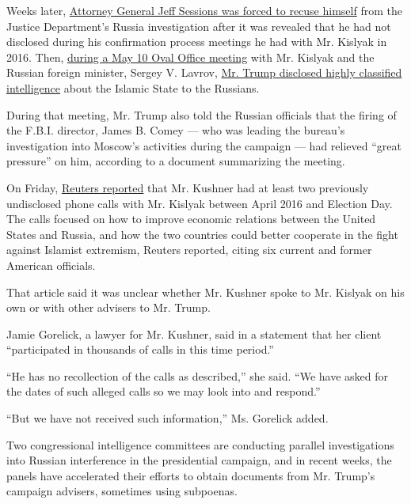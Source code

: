 Weeks later,
\href{https://www.nytimes3xbfgragh.onion/2017/03/02/us/politics/jeff\%2Dsessions\%2Drussia\%2Dtrump\%2Dinvestigation\%2Ddemocrats.html}{Attorney
General Jeff Sessions was forced to recuse himself} from the Justice
Department's Russia investigation after it was revealed that he had not
disclosed during his confirmation process meetings he had with Mr.
Kislyak in 2016. Then,
\href{https://www.nytimes3xbfgragh.onion/2017/05/10/world/europe/trump-russia-foreign-minister-sergey-lavrov-meeting.html}{during
a May 10 Oval Office meeting} with Mr. Kislyak and the Russian foreign
minister, Sergey V. Lavrov,
\href{https://www.nytimes3xbfgragh.onion/2017/05/15/us/politics/trump-russia-classified-information-isis.html}{Mr.
Trump disclosed highly classified intelligence} about the Islamic State
to the Russians.

During that meeting, Mr. Trump also told the Russian officials that the
firing of the F.B.I. director, James B. Comey --- who was leading the
bureau's investigation into Moscow's activities during the campaign ---
had relieved ``great pressure'' on him, according to a document
summarizing the meeting.

On Friday,
\href{https://www.reuters.com/article/us-usa-trump-fbi-kushner-exclusive-idUSKBN18N018}{Reuters
reported} that Mr. Kushner had at least two previously undisclosed phone
calls with Mr. Kislyak between April 2016 and Election Day. The calls
focused on how to improve economic relations between the United States
and Russia, and how the two countries could better cooperate in the
fight against Islamist extremism, Reuters reported, citing six current
and former American officials.

That article said it was unclear whether Mr. Kushner spoke to Mr.
Kislyak on his own or with other advisers to Mr. Trump.

Jamie Gorelick, a lawyer for Mr. Kushner, said in a statement that her
client ``participated in thousands of calls in this time period.''

``He has no recollection of the calls as described,'' she said. ``We
have asked for the dates of such alleged calls so we may look into and
respond.''

``But we have not received such information,'' Ms. Gorelick added.

Two congressional intelligence committees are conducting parallel
investigations into Russian interference in the presidential campaign,
and in recent weeks, the panels have accelerated their efforts to obtain
documents from Mr. Trump's campaign advisers, sometimes using subpoenas.

